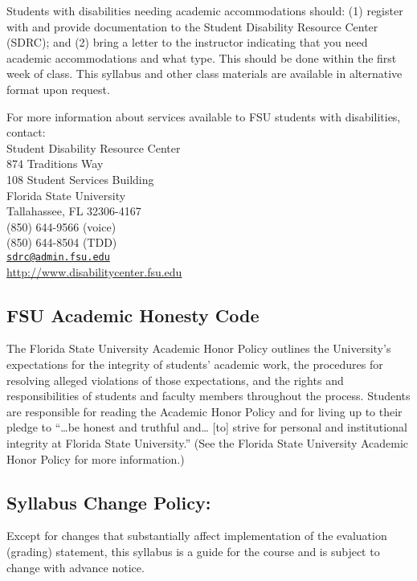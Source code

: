 \documentclass[11pt,]{article}
\begin{document}
Students with disabilities needing academic accommodations should: (1)
register with and provide documentation to the Student Disability
Resource Center (SDRC); and (2) bring a letter to the instructor
indicating that you need academic accommodations and what type. This
should be done within the first week of class. This syllabus and other
class materials are available in alternative format upon request.

For more information about services available to FSU students with
disabilities, contact:\\
Student Disability Resource Center\\
874 Traditions Way\\
108 Student Services Building\\
Florida State University\\
Tallahassee, FL 32306-4167\\
(850) 644-9566 (voice)\\
(850) 644-8504 (TDD)\\
\href{mailto:sdrc@admin.fsu.edu}{\nolinkurl{sdrc@admin.fsu.edu}}\\
\url{http://www.disabilitycenter.fsu.edu}

\hypertarget{fsu-academic-honesty-code}{%
\subsection{FSU Academic Honesty Code}\label{fsu-academic-honesty-code}}

The Florida State University Academic Honor Policy outlines the
University's expectations for the integrity of students' academic work,
the procedures for resolving alleged violations of those expectations,
and the rights and responsibilities of students and faculty members
throughout the process. Students are responsible for reading the
Academic Honor Policy and for living up to their pledge to ``\ldots{}be
honest and truthful and\ldots{} {[}to{]} strive for personal and
institutional integrity at Florida State University.'' (See the Florida
State University Academic Honor Policy for more information.)

\hypertarget{syllabus-change-policy}{%
\subsection{Syllabus Change Policy:}\label{syllabus-change-policy}}

Except for changes that substantially affect implementation of the
evaluation (grading) statement, this syllabus is a guide for the course
and is subject to change with advance notice.
\end{document}
